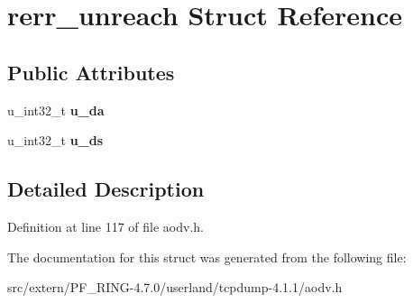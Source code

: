 \hypertarget{structrerr__unreach}{
\section{rerr\_\-unreach Struct Reference}
\label{structrerr__unreach}
}
\subsection*{Public Attributes}
\begin{DoxyCompactItemize}
\item 
\hypertarget{structrerr__unreach_aef90b0ea384aca27573963e5548dab83}{
u\_\-int32\_\-t {\bfseries u\_\-da}}
\label{structrerr__unreach_aef90b0ea384aca27573963e5548dab83}

\item 
\hypertarget{structrerr__unreach_a3cb1a43186027939c82b689c61a29090}{
u\_\-int32\_\-t {\bfseries u\_\-ds}}
\label{structrerr__unreach_a3cb1a43186027939c82b689c61a29090}

\end{DoxyCompactItemize}


\subsection{Detailed Description}


Definition at line 117 of file aodv.h.



The documentation for this struct was generated from the following file:\begin{DoxyCompactItemize}
\item 
src/extern/PF\_\-RING-\/4.7.0/userland/tcpdump-\/4.1.1/aodv.h\end{DoxyCompactItemize}
